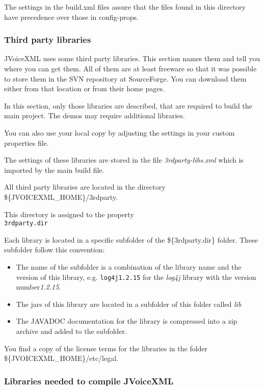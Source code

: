\documentclass[11pt,a4paper]{article}
\begin{document}
The settings in the build.xml files assure that the files
found in this directory have precedence over those in config-props.

\subsubsection{Third party libraries}
\label{sec:third-party-libr}

JVoiceXML uses some third party libraries. This section names them and tell
you where you can get them. All of them are at least freeware
so that it was possible to store them in the SVN repository at
SourceForge. You can download them either from that location or
from their home pages. 

In this section, only those libraries are described, that are required
to build the main project. The demos may require additional libraries.

You can also use your local copy by adjusting the settings in your
custom properties file.

The settings of these libraries are stored in the file \emph{3rdparty-libs.xml}
which is imported by the main build file.

All third party libraries are located in the directory \\
\$\{JVOICEXML\_HOME\}/3rdparty.

This directory is assigned to the property \\
\texttt{3rdparty.dir}

Each library is located in a specific subfolder of the \$\{3rdparty.dir\}
folder. These subfolder follow this convention:

\begin{itemize}
\item The name of the subfolder is a combination of the library name and
the version of this library, e.g. \texttt{log4j1.2.15} for the \emph{log4j}
library with the version number\emph{1.2.15}.
\item The jars of this library are located in a subfolder of this folder
called \emph{lib}
\item The JAVADOC documentation for the library is compressed into a zip
archive and added to the subfolder.
\end{itemize}

You find a copy of the license terms for the libraries in the folder
\$\{JVOICEXML\_HOME\}/etc/legal.

\subsubsection{Libraries needed to compile JVoiceXML}
\label{sec:libr-need-comp}
\end{document}
